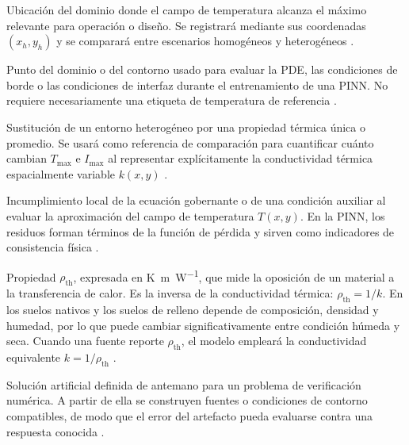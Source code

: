 \documentclass[11pt,a4paper,oneside]{report}
\newcommand{\Tmax}{T_{\max}}
\newcommand{\Imax}{I_{\max}}
\newcommand{\kx}{k(x,y)}
\newcommand{\rhoth}{\rho_{\mathrm{th}}}
\begin{document}
\begin{description}[style=nextline,itemsep=0.5\baselineskip,parsep=0pt,topsep=0.25\baselineskip]
  \item[Punto caliente.] Ubicación del dominio donde el campo de temperatura alcanza el máximo relevante para operación o diseño. Se registrará mediante sus coordenadas $(x_h,y_h)$ y se comparará entre escenarios homogéneos y heterogéneos \parencites[1,6--9]{khumalo2025}[1,10,16]{kim2025}.

  \item[Punto de colocación.] Punto del dominio o del contorno usado para evaluar la PDE, las condiciones de borde o las condiciones de interfaz durante el entrenamiento de una PINN. No requiere necesariamente una etiqueta de temperatura de referencia \parencites[686--690]{raissi2019}[1--2]{lawal2022}.

  \item[Representación homogénea equivalente.] Sustitución de un entorno heterogéneo por una propiedad térmica única o promedio. Se usará como referencia de comparación para cuantificar cuánto cambian $\Tmax$ e $\Imax$ al representar explícitamente la conductividad térmica espacialmente variable $\kx$ \parencites{farouki1981thermal,devries1966thermal}[4--6]{enescu2021}[3--4,41--42,93--99]{cigre2025}.

  \item[Residuo físico.] Incumplimiento local de la ecuación gobernante o de una condición auxiliar al evaluar la aproximación del campo de temperatura $T(x,y)$. En la PINN, los residuos forman términos de la función de pérdida y sirven como indicadores de consistencia física \parencites[686--690]{raissi2019}[1--2,14--17]{lawal2022}.

  \item[Resistividad térmica.] Propiedad $\rhoth$, expresada en \si{\kelvin\metre\per\watt}, que mide la oposición de un material a la transferencia de calor. Es la inversa de la conductividad térmica: $\rhoth=1/k$. En los suelos nativos y los suelos de relleno depende de composición, densidad y humedad, por lo que puede cambiar significativamente entre condición húmeda y seca. Cuando una fuente reporte $\rhoth$, el modelo empleará la conductividad equivalente $k=1/\rhoth$ \parencites{farouki1981thermal,devries1966thermal}[1,6--9]{khumalo2025}[secciones 4--6]{ieee442}.

  \item[Solución manufacturada.] Solución artificial definida de antemano para un problema de verificación numérica. A partir de ella se construyen fuentes o condiciones de contorno compatibles, de modo que el error del artefacto pueda evaluarse contra una respuesta conocida \parencites{cigre2022}[93--99]{cigre2025}.


\end{description}
\end{document}
